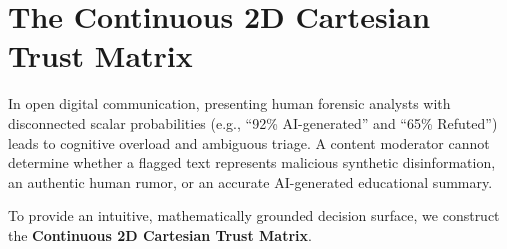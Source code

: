 \section{The Continuous 2D Cartesian Trust Matrix}
\label{sec:continuous_trust_matrix}

In open digital communication, presenting human forensic analysts with disconnected scalar probabilities (e.g., ``92\% AI-generated'' and ``65\% Refuted'') leads to cognitive overload and ambiguous triage. A content moderator cannot determine whether a flagged text represents malicious synthetic disinformation, an authentic human rumor, or an accurate AI-generated educational summary.

To provide an intuitive, mathematically grounded decision surface, we construct the \textbf{Continuous 2D Cartesian Trust Matrix}.

